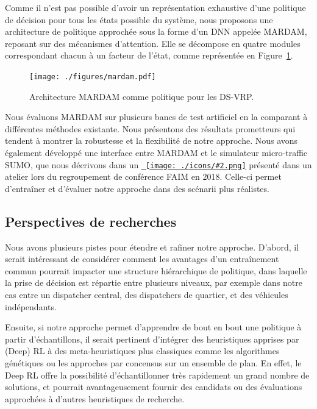 \documentclass[a4paper, 11pt]{article}
\newcommand{\useicon}[2][8pt]{\texttt{[image: ./icons/\#2.png]}}
\newcommand{\jumpto}[2]{\hyperref[#2]{\color{cyan!70!black}{#1}~\useicon{jump}}}
\begin{document}
    \hspace{7mm}Comme il n'est pas possible d'avoir un repr{\'e}sentation exhaustive d'une politique de d{\'e}cision
    pour tous les {\'e}tats possible du syst{\`e}me, nous proposons une architecture de politique approch{\'e}e sous la forme d'un DNN appel{\'e}e MARDAM,
    reposant sur des m{\'e}canismes d'attention.
    Elle se d{\'e}compose en quatre modules correspondant chacun {\`a} un facteur de l'{\'e}tat, comme repr{\'e}sent{\'e}e en Figure~\ref{fig:mardam}.

    \begin{figure}[h]
        \centering
        \texttt{[image: ./figures/mardam.pdf]}
        \caption{Architecture MARDAM comme politique pour les DS-VRP.}
        \label{fig:mardam}
    \end{figure}

    \hspace{7mm}Nous {\'e}valuons MARDAM sur plusieurs bancs de test artificiel en la comparant {\`a} diff{\'e}rentes m{\'e}thodes existante.
    Nous pr{\'e}sentons des r{\'e}sultats prometteurs qui tendent {\`a} montrer la robustesse et la flexibilit{\'e} de notre approche.
    Nous avons {\'e}galement d{\'e}velopp{\'e} une interface entre MARDAM et le simulateur micro-traffic SUMO,
    que nous d{\'e}crivons dans un \jumpto{article}{ref:pgmrl} pr{\'e}sent{\'e} dans un atelier lors du regroupement de conf{\'e}rence FAIM en 2018.
    Celle-ci permet d'entra{\^i}ner et d'{\'e}valuer notre approche dans des sc{\'e}narii plus r{\'e}alistes.

    \subsection*{Perspectives de recherches}

    \hspace{7mm}Nous avons plusieurs pistes pour {\'e}tendre et rafiner notre approche.
    D'abord, il serait int{\'e}ressant de consid{\'e}rer comment les avantages d'un entra{\^i}nement commun pourrait impacter
    une structure hi{\'e}rarchique de politique, dans laquelle la prise de d{\'e}cision est r{\'e}partie entre plusieurs niveaux,
    par exemple dans notre cas entre un dispatcher central, des dispatchers de quartier, et des v{\'e}hicules ind{\'e}pendants.

    \hspace{7mm}Ensuite, si notre approche permet d'apprendre de bout en bout une politique {\`a} partir d'{\'e}chantillons,
    il serait pertinent d'int{\'e}grer des heuristiques apprises par (Deep) RL {\`a} des meta-heuristiques plus classiques
    comme les algorithmes g{\'e}n{\'e}tiques ou les approches par concensus sur un ensemble de plan.
    En effet, le Deep RL offre la possibilit{\'e} d'{\'e}chantillonner tr{\`e}s rapidement un grand nombre de solutions,
    et pourrait avantageusement fournir des candidats ou des {\'e}valuations approch{\'e}es {\`a} d'autres heuristiques de recherche.
\end{document}
